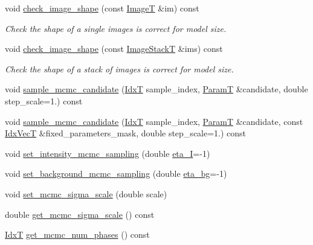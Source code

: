 \begin{DoxyCompactItemize}
\item 
void \hyperlink{classmappel_1_1ImageFormat2DBase_aa5f3936c1c0b250fa1df17d53161a991}{check\+\_\+image\+\_\+shape} (const \hyperlink{classmappel_1_1ImageFormat2DBase_a667ea5016648958e507e7db8eaa041b0}{ImageT} \&im) const 
\begin{DoxyCompactList}\small\item\em Check the shape of a single images is correct for model size. \end{DoxyCompactList}\item 
void \hyperlink{classmappel_1_1ImageFormat2DBase_ab40faca8bf94a6e59765da5c3185c19b}{check\+\_\+image\+\_\+shape} (const \hyperlink{classmappel_1_1ImageFormat2DBase_a8f0276e94ff242fa4740a718642f5e14}{Image\+StackT} \&ims) const 
\begin{DoxyCompactList}\small\item\em Check the shape of a stack of images is correct for model size. \end{DoxyCompactList}\item 
void \hyperlink{classmappel_1_1MCMCAdaptor2Ds_a0d9821e431262d6677e814a84f88eb01}{sample\+\_\+mcmc\+\_\+candidate} (\hyperlink{namespacemappel_ab17ec0f30b61ece292439d7ece81d3a8}{IdxT} sample\+\_\+index, \hyperlink{classmappel_1_1PointEmitterModel_a665ec6aea3aac139bb69a23c06d4b9a1}{ParamT} \&candidate, double step\+\_\+scale=1.) const 
\item 
void \hyperlink{classmappel_1_1MCMCAdaptor2Ds_ac9284f30a2b003b5e1381254029da4d1}{sample\+\_\+mcmc\+\_\+candidate} (\hyperlink{namespacemappel_ab17ec0f30b61ece292439d7ece81d3a8}{IdxT} sample\+\_\+index, \hyperlink{classmappel_1_1PointEmitterModel_a665ec6aea3aac139bb69a23c06d4b9a1}{ParamT} \&candidate, const \hyperlink{namespacemappel_ac63743dcd42180127307cd0e4ecdd784}{Idx\+VecT} \&fixed\+\_\+parameters\+\_\+mask, double step\+\_\+scale=1.) const 
\item 
void \hyperlink{classmappel_1_1MCMCAdaptor1D_ac70f768928859b1e9449b0ec1a141c4c}{set\+\_\+intensity\+\_\+mcmc\+\_\+sampling} (double \hyperlink{classmappel_1_1MCMCAdaptor1D_a5780d326be0c40e10d6c91777cfffbd3}{eta\+\_\+I}=-\/1)
\item 
void \hyperlink{classmappel_1_1MCMCAdaptor1D_ae79ee3845fbdd0e378f00eeebf8ccef1}{set\+\_\+background\+\_\+mcmc\+\_\+sampling} (double \hyperlink{classmappel_1_1MCMCAdaptor1D_af54c93421b8e298289cbb92743c6b3d5}{eta\+\_\+bg}=-\/1)
\item 
void \hyperlink{classmappel_1_1MCMCAdaptorBase_aa6b8eea136bf1f34f0c50bf8d1937a58}{set\+\_\+mcmc\+\_\+sigma\+\_\+scale} (double scale)
\item 
double \hyperlink{classmappel_1_1MCMCAdaptorBase_a9de5ee52bbf5c8fd3c1e3bd00836801a}{get\+\_\+mcmc\+\_\+sigma\+\_\+scale} () const 
\item 
\hyperlink{namespacemappel_ab17ec0f30b61ece292439d7ece81d3a8}{IdxT} \hyperlink{classmappel_1_1MCMCAdaptorBase_adb9997f1dc774f3a169c61cdb730a85f}{get\+\_\+mcmc\+\_\+num\+\_\+phases} () const 
\end{DoxyCompactItemize}
